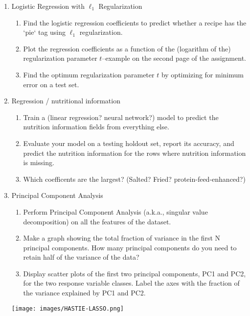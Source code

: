 \documentclass[12pt]{book}
\theoremstyle{definition}
\begin{document}
\begin{enumerate}

  \item Logistic Regression with $\ell_1$ Regularization
  \begin{enumerate}
    \item Find the logistic regression coefficients to predict whether a recipe has the `pie` tag using $\ell_1$ regularization.  
    \item Plot the regression coefficients as a function of the (logarithm of the) regularization parameter $t$--example on the second page of the assignment. 
    \item Find the optimum regularization parameter $t$ by optimizing for minimum error on a test set.
  \end{enumerate}
  
\item Regression / nutritional information
  \begin{enumerate}
    \item Train a (linear regression?  neural network?)  model to predict the nutrition information fields from everything else.  
    \item  Evaluate your model on a testing holdout set, report its accuracy, and predict the nutrition information for the rows where nutrition information is missing.
    \item  Which coefficents are the largest?  (Salted?  Fried?  protein-feed-enhanced?)
  \end{enumerate}

  \item Principal Component Analysis 
  \begin{enumerate}
    \item Perform Principal Component Analysis (a.k.a., singular value decomposition) on all the features of the dataset. 
    \item Make a graph showing the total fraction of variance in the first N principal components.   How many principal components do you need to retain half of the variance of the data?
    \item Display scatter plots of the first two principal components, PC1 and PC2, for the two response variable classes. Label the axes with the fraction of the variance explained by PC1 and PC2. 
  \end{enumerate}


\texttt{[image: images/HASTIE-LASSO.png]}


\end{enumerate}
\end{document}
